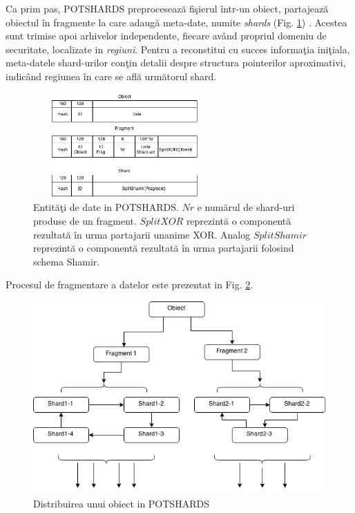 \documentclass{llncs}
\newcommand{\todo}[1]{{\color{red}{TODO #1}}}
\begin{document}
Ca prim pas, POTSHARDS preproceseaz\u{a} fi\c{s}ierul \^{i}ntr-un obiect, partajeaz\u{a} obiectul \^{i}n fragmente la care adaug\u{a} meta-date, numite \textit{shards} (Fig. \ref{fig:data-potshard}) \cite{SGMV:2009}. Acestea sunt trimise apoi arhivelor independente, fiecare av\^{a}nd propriul domeniu de securitate, localizate in \textit{regiuni}. Pentru a reconstitui cu succes informa\c{t}ia ini\c{t}iala, meta-datele shard-urilor con\c{t}in detalii despre structura pointerilor aproximativi, indic\^{a}nd regiunea \^{i}n care se afl\u{a} urm\u{a}torul shard.

\begin{figure}
	\begin{center}
	\includegraphics[width=7cm, height=4cm]{img/Shards.png}    %
	\caption{Entit\u{a}\c{t}i de date in POTSHARDS. $Nr$ e num\u{a}rul de shard-uri produse de un fragment.
		$SplitXOR$ reprezint\u{a} o component\u{a} rezultat\u{a} \^{i}n urma partajarii unanime XOR. Analog $SplitShamir$ reprezint\u{a} o component\u{a} rezultat\u{a} \^{i}n urma partajarii folosind schema Shamir. \todo{cite!}}
	\label{fig:data-potshard}
	\bigskip
	\end{center}
\end{figure}

Procesul de fragmentare a datelor este prezentat in Fig. \ref{fig:potshards-layers}.

\begin{figure}
	\begin{center}
	\includegraphics[width=12cm]{img/POTSHARDS.png}    %
	\caption{Distribuirea unui obiect in POTSHARDS}
	\label{fig:potshards-layers}
	\bigskip
	\end{center}
\end{figure}
\end{document}
